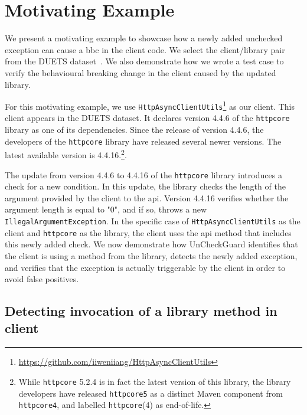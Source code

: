 \chapter{Motivating Example}

We present a motivating example to showcase how a newly added unchecked exception can cause a \gls{bbc} in the client code. We select the client/library pair from the DUETS dataset~\cite{durieux21:_duets}. We also demonstrate how we wrote a test case to verify the behavioural breaking change in the client caused by the updated library.

For this motivating example, we use \texttt{HttpAsyncClientUtils}\footnote{\url{https://github.com/iiweniiang/HttpAsyncClientUtils}} as our client. This client appears in the DUETS dataset. It declares version 4.4.6 of the \texttt{httpcore} library as one of its dependencies. Since the release of version 4.4.6, the developers of the \texttt{httpcore} library have released several newer versions. The latest available version is 4.4.16.\footnote{While \texttt{httpcore} 5.2.4 is in fact the latest version of this library, the library developers have released \texttt{httpcore5} as a distinct Maven component from \texttt{httpcore4}, and labelled \texttt{httpcore}(4) as end-of-life.}.

The update from version 4.4.6 to 4.4.16 of the \texttt{httpcore} library introduces a check for a new condition. In this update, the library checks the length of the argument provided by the client to the \gls{api}. Version 4.4.16 verifies whether the argument length is equal to "0", and if so, throws a new \texttt{IllegalArgumentException}. In the specific case of \texttt{HttpAsyncClientUtils} as the client and \texttt{httpcore} as the library, the client uses the \gls{api} method that includes this newly added check. We now demonstrate how UnCheckGuard identifies that the client is using a method from the library, detects the newly added exception, and verifies that the exception is actually triggerable by the client in order to avoid false positives.

\section{Detecting invocation of a library method in client}

